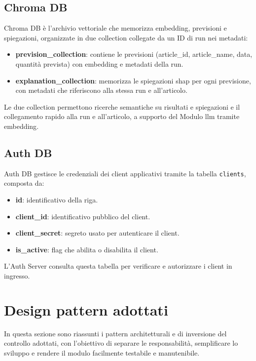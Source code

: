 \subsection{Chroma DB}
Chroma DB è l’archivio vettoriale che memorizza \gls{embedding}, previsioni e spiegazioni, organizzate in due collection collegate da un ID di run nei metadati:
\begin{itemize}
    \item \textbf{prevision\_collection}: contiene le previsioni (article\_id, article\_name, data, quantità prevista) con \gls{embedding} e metadati della run.
    \item \textbf{explanation\_collection}: memorizza le spiegazioni \acrshort{shap} per ogni previsione, con metadati che riferiscono alla stessa run e all’articolo.
\end{itemize}
Le due collection permettono ricerche semantiche su risultati e spiegazioni e il collegamento rapido alla run e all’articolo, a supporto del Modulo \acrshort{llm} tramite \gls{embedding}.

\subsection{Auth DB}
Auth DB gestisce le credenziali dei client applicativi tramite la tabella \texttt{clients}, composta da:
\begin{itemize}
    \item \textbf{id}: identificativo della riga.
    \item \textbf{client\_id}: identificativo pubblico del client.
    \item \textbf{client\_secret}: segreto usato per autenticare il client.
    \item \textbf{is\_active}: flag che abilita o disabilita il client.
\end{itemize}
L’Auth Server consulta questa tabella per verificare e autorizzare i client in ingresso.

\section{Design pattern adottati}
\label{sec:design-pattern}
In questa sezione sono riassunti i pattern architetturali e di inversione del controllo adottati, con l’obiettivo di separare le responsabilità, semplificare lo sviluppo e rendere il modulo facilmente testabile e manutenibile.

